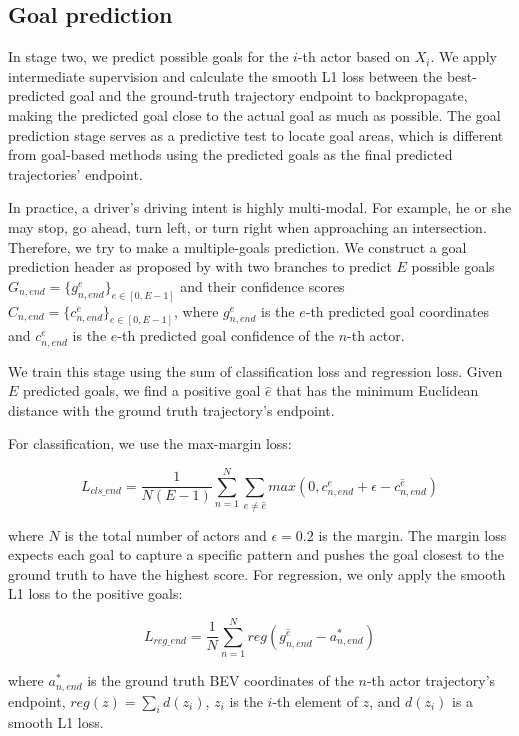 \subsection{Goal prediction}

In stage two, we predict possible goals for the $i$-th actor based on $X_i$. 
We apply intermediate supervision and calculate the smooth L1 loss between the best-predicted goal and the ground-truth trajectory endpoint to backpropagate, making the predicted goal close to the actual goal as much as possible. The goal prediction stage serves as a predictive test to locate goal areas, which is different from goal-based methods using the predicted goals as the final predicted trajectories' endpoint. 

In practice, a driver's driving intent is highly multi-modal. For example, he or she may stop, go ahead, turn left, or turn right when approaching an intersection. Therefore, we try to make a multiple-goals prediction. We construct a goal prediction header as proposed by \cite{wang2022ganet} with two branches to predict $E$ possible goals $G_{n,end} =\{g_{n,end}^e\}_{e \in [0,E-1]}$ and their confidence scores $    C_{n,end} = \{c_{n,end}^e\}_{e \in [0,E-1]}$, 
where $g_{n,end}^e$ is the $e$-th predicted goal coordinates and $c_{n,end}^e$ is the $e$-th predicted goal confidence of the $n$-th actor.

We train this stage using the sum of classification loss and regression loss.
Given $E$ predicted goals, we find a positive goal $\hat{e}$ that has the minimum Euclidean distance with the ground truth trajectory's endpoint. 

For classification, we use the max-margin loss:

\begin{equation}
	L_{cls\_end}=\frac{1}{N(E-1)}\sum_{n=1}^N\sum_{e\neq \hat{e}}{max(0,c^e_{n,end}+\epsilon -c^{\hat{e}}_{n,end})}
\end{equation}

where $N$ is the total number of actors and $\epsilon =0.2$ is the margin. The margin loss expects each goal to capture a specific pattern and pushes the goal closest to the ground truth to have the highest score.
For regression, we only apply the smooth L1 loss to the positive goals:

\begin{equation}
	L_{reg\_end}=\frac{1}{N}\sum_{n=1}^N{reg(g_{n,end}^{\hat{e}}-a^{*}_{n,end})}
\end{equation}

where $a^{*}_{n,end}$ is the ground truth BEV coordinates of the $n$-th actor trajectory's endpoint, $reg(z) = \sum_id(z_i)$, $z_i$ is the $i$-th element of $z$, and $d(z_i)$ is a smooth L1 loss.

